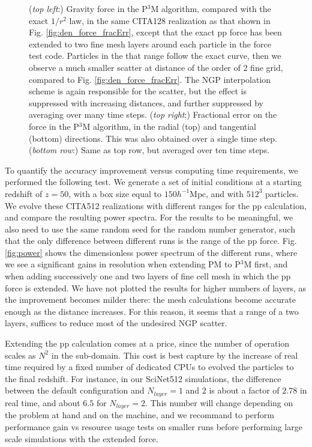 \documentclass[useAMS,usenatbib]{mn2e}
\begin{document}
\begin{figure}
\begin{center}
    \caption{({\it top left}:) Gravity force in the P$^3$M algorithm, compared with the exact $1/r^{2}$ law,
  in the same CITA128 realization as that shown in Fig. \ref{fig:den_force_fracErr}, 
  except that the exact pp force has been extended to two fine mesh layers around each particle
  in the force test code.
  Particles in the that range follow the exact curve, then we observe a much smaller scatter at 
  distance of the order of 2 fine grid, compared to Fig. \ref{fig:den_force_fracErr}. 
  The NGP interpolation scheme is again responsible for the scatter, but the effect is suppressed with increasing distances, and further suppressed by averaging over many time steps.
  ({\it top right}:) Fractional error on the force in the P$^3$M algorithm, in the radial (top) and tangential (bottom) directions.
  This was also obtained over a single time step.
  ({\it bottom row}:) Same as top row, but averaged over ten time steps.
    \label{fig:den_force_fracErr_ppext6}}
\end{center}
\end{figure}

 
 
 To quantify the accuracy improvement versus computing time requirements, we performed the following test.
 We generate a set of initial conditions at a starting redshift of $z = 50$, with a box size equal to $ 150 h^{-1}\mbox{Mpc}$,
 and with $512^{3}$ particles. We evolve these CITA512 realizations with different ranges for the pp calculation, and compare 
 the resulting power spectra. For the results to be meaningful, we also need to use the same random seed for the random number generator,
 such that the only difference between different runs is the range of the pp force.
 Fig. \ref{fig:power} shows the dimensionless power spectrum of the different runs, where we see a significant gains in resolution
 when extending  PM to P$^{3}$M first, and when adding successively one and two layers of fine cell mesh in which the pp force is extended.
We have not plotted the results for higher numbers of layers, as the improvement becomes milder there: the mesh calculations
become accurate enough as the distance increases. For this reason, it seems that a range of a two layers, suffices 
to reduce most of the undesired NGP scatter.

Extending the pp calculation comes at a price, since the number of operation scales as  $N^{2}$ in the sub-domain. 
This cost is best capture by the increase of real time required by a fixed number of dedicated  {\small CPU}s 
to evolved the particles to the final redshift. For instance, in our SciNet512 simulations, 
the difference between the default configuration and $N_{layer} = 1$ and $2$ is about a factor of $2.78$ in real time,
and about $6.5$ for $N_{layer} = 2$.
This number will change depending on the problem at hand and on the machine, and we recommand
to perform performance gain vs resource usage tests on smaller runs before performing large scale simulations
with the extended force.
\end{document}
